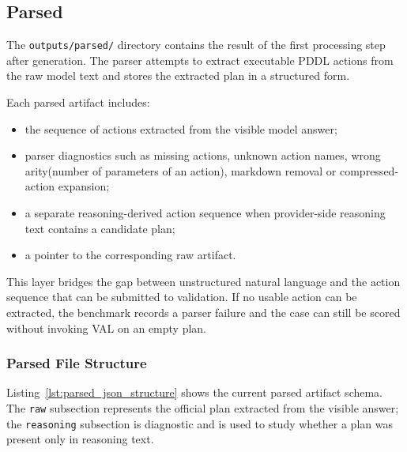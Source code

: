 \subsection{Parsed}

The \texttt{outputs/parsed/} directory contains the result of the first processing step after generation. The parser attempts to extract executable PDDL actions from the raw model text and stores the extracted plan in a structured form.

Each parsed artifact includes:
\begin{itemize}
    \item the sequence of actions extracted from the visible model answer;
    \item parser diagnostics such as missing actions, unknown action names, wrong arity(number of parameters of an action), markdown removal or compressed-action expansion;
    \item a separate reasoning-derived action sequence when provider-side reasoning text contains a candidate plan;
    \item a pointer to the corresponding raw artifact.
\end{itemize}

This layer bridges the gap between unstructured natural language and the action sequence that can be submitted to validation. If no usable action can be extracted, the benchmark records a parser failure and the case can still be scored without invoking VAL on an empty plan.

\subsubsection{Parsed File Structure}

Listing~\ref{lst:parsed_json_structure} shows the current parsed artifact schema. The \texttt{raw} subsection represents the official plan extracted from the visible answer; the \texttt{reasoning} subsection is diagnostic and is used to study whether a plan was present only in reasoning text.

